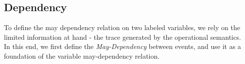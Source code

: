%
%
%
\subsection{Dependency}
  
 To define the may dependency relation on two labeled variables, we rely on the limited information at hand - the trace generated by the operational semantics. In this end, we first define the \emph{May-Dependency} between events, and use it as a foundation of the variable may-dependency relation.
 
